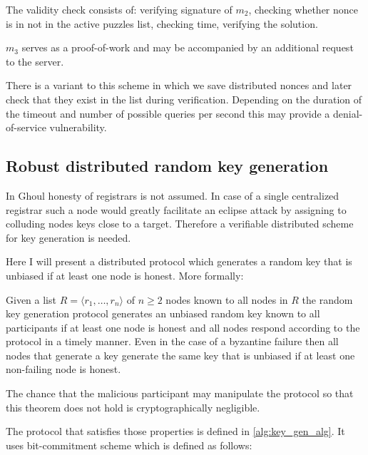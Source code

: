 The validity check consists of: verifying signature of $m_2$, checking whether
nonce is in not in the active puzzles list, checking time, verifying the
solution.

$m_3$ serves as a proof-of-work and may be accompanied by an additional request
to the server.

There is a variant to this scheme in which we save distributed nonces and later
check that they exist in the list during verification. Depending on the duration
of the timeout and number of possible queries per second this may provide a
denial-of-service vulnerability.

\subsection{Robust distributed random key generation}

In Ghoul honesty of registrars is not assumed. In case of a single centralized
registrar such a node would greatly facilitate an eclipse attack by assigning to
colluding nodes keys close to a target. Therefore a verifiable distributed
scheme for key generation is needed.

Here I will present a distributed protocol which generates a random key that is
unbiased if at least one node is honest. More formally:

\begin{theorem*}
  Given a list $R = \langle r_1, \ldots, r_n \rangle$ of $n \geq 2$ nodes known
  to all nodes in $R$ the random key generation protocol generates an unbiased
  random key known to all participants if at least one node is honest and all
  nodes respond according to the protocol in a timely manner. Even in the case
  of a byzantine failure then all nodes that generate a key generate the same
  key that is unbiased if at least one non-failing node is honest.

  The chance that the malicious participant may manipulate the protocol so that
  this theorem does not hold is cryptographically negligible.
\end{theorem*}

The protocol that satisfies those properties is defined in
\ref{alg:key_gen_alg}.  It uses bit-commitment scheme which is defined as
follows:

